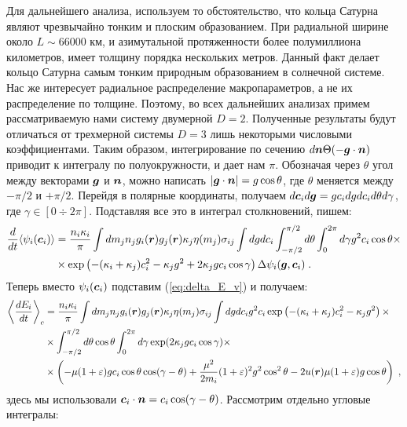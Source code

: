 Для дальнейшего анализа, используем то обстоятельство, что кольца Сатурна являют чрезвычайно тонким и плоским образованием.
При радиальной ширине около $L\sim 66 000$ км, и азимутальной протяженности более полумиллиона километров, имеет толщину 
порядка нескольких метров. Данный факт делает кольцо Сатурна самым тонким природным образованием в солнечной системе. 
Нас же интересует радиальное распределение макропараметров, а не их распределение по толщине. Поэтому, во всех дальнейших
анализах примем рассматриваемую нами систему двумерной $D=2$. Полученные результаты будут отличаться от трехмерной системы
$D=3$ лишь некоторыми числовыми коэффициентами. Таким образом, интегрирование по сечению $d\bm{n}\Theta(-\bm{g}\cdot\bm{n})$ приводит
к интегралу по полуокружности, и дает нам $\pi$. Обозначая через $\theta$ угол между векторами $\bm{g}$ и $\bm{n}$, можно написать
$\vert\bm{g}\cdot\bm{n}\vert=g\cos\theta$, где $\theta$ меняется между $-\pi/2$ и $+\pi/2$. Перейдя в полярные координаты, получаем
$d\bm{c}_id\bm{g}=gc_i dg dc_id\theta d\gamma$, где $\gamma\in[0\div 2\pi]$. Подставляя все это в интеграл столкновений, пишем:
\begin{equation}
  \begin{split}
    \frac{d}{dt}\langle\psi_i(\bm{c}_i)\rangle &=\frac{n_i\kappa_i}{\pi}\int dm_jn_jg_i(\bm{r})g_j(\bm{r})\kappa_j\eta(m_j)\sigma_{ij}
    \int dgdc_i\int_{-\pi/2}^{\pi/2}d\theta\int_0^{2\pi}d\gamma g^2c_i\cos\theta\times \\
    &\times\exp\left(-(\kappa_i+\kappa_j)c^2_i-\kappa_jg^2+2\kappa_jgc_i\cos\gamma\right)\Delta\psi_i(\bm{g},\bm{c}_i)\;.
  \end{split}
\end{equation}
Теперь вместо $\psi_i(\bm{c}_i)$ подставим (\ref{eq:delta_E_v}) и получаем:
\begin{equation}
  \begin{split}
    \left\langle\frac{dE_i}{dt}\right\rangle_c &= \frac{n_i\kappa_i}{\pi}\int dm_jn_jg_i(\bm{r})g_j(\bm{r})\kappa_j\eta(m_j)\sigma_{ij}
    \int dgdc_i g^2c_i\exp\left(-(\kappa_i+\kappa_j)c^2_i-\kappa_jg^2\right)\times\\
    &\times\int_{-\pi/2}^{\pi/2}d\theta\cos\theta\int_{0}^{2\pi}d\gamma\exp(2\kappa_jgc_i\cos\gamma)\times \\
    &\times\left(-\mu(1+\varepsilon)gc_i\cos\theta\cos(\gamma-\theta)+\frac{\mu^2}{2m_i}(1+\varepsilon)^2g^2\cos^2\theta-
    2u(\bm{r})\mu(1+\varepsilon)g\cos\theta\right)\;,
  \end{split}
\end{equation}
здесь мы использовали $\bm{c}_i\cdot\bm{n}=c_i\cos(\gamma-\theta)$. Рассмотрим отдельно угловые интегралы:

